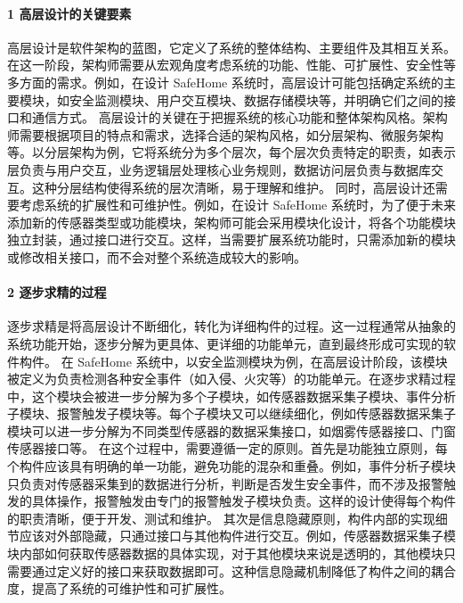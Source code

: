 \paragraph{1 高层设计的关键要素}\label{ux9ad8ux5c42ux8bbeux8ba1ux7684ux5173ux952eux8981ux7d20}
高层设计是软件架构的蓝图，它定义了系统的整体结构、主要组件及其相互关系。在这一阶段，架构师需要从宏观角度考虑系统的功能、性能、可扩展性、安全性等多方面的需求。例如，在设计 SafeHome
系统时，高层设计可能包括确定系统的主要模块，如安全监测模块、用户交互模块、数据存储模块等，并明确它们之间的接口和通信方式。
高层设计的关键在于把握系统的核心功能和整体架构风格。架构师需要根据项目的特点和需求，选择合适的架构风格，如分层架构、微服务架构等。以分层架构为例，它将系统分为多个层次，每个层次负责特定的职责，如表示层负责与用户交互，业务逻辑层处理核心业务规则，数据访问层负责与数据库交互。这种分层结构使得系统的层次清晰，易于理解和维护。
同时，高层设计还需要考虑系统的扩展性和可维护性。例如，在设计 SafeHome
系统时，为了便于未来添加新的传感器类型或功能模块，架构师可能会采用模块化设计，将各个功能模块独立封装，通过接口进行交互。这样，当需要扩展系统功能时，只需添加新的模块或修改相关接口，而不会对整个系统造成较大的影响。 \paragraph{2
逐步求精的过程}\label{ux9010ux6b65ux6c42ux7cbeux7684ux8fc7ux7a0b}
逐步求精是将高层设计不断细化，转化为详细构件的过程。这一过程通常从抽象的系统功能开始，逐步分解为更具体、更详细的功能单元，直到最终形成可实现的软件构件。 在 SafeHome
系统中，以安全监测模块为例，在高层设计阶段，该模块被定义为负责检测各种安全事件（如入侵、火灾等）的功能单元。在逐步求精过程中，这个模块会被进一步分解为多个子模块，如传感器数据采集子模块、事件分析子模块、报警触发子模块等。每个子模块又可以继续细化，例如传感器数据采集子模块可以进一步分解为不同类型传感器的数据采集接口，如烟雾传感器接口、门窗传感器接口等。
在这个过程中，需要遵循一定的原则。首先是功能独立原则，每个构件应该具有明确的单一功能，避免功能的混杂和重叠。例如，事件分析子模块只负责对传感器采集到的数据进行分析，判断是否发生安全事件，而不涉及报警触发的具体操作，报警触发由专门的报警触发子模块负责。这样的设计使得每个构件的职责清晰，便于开发、测试和维护。
其次是信息隐藏原则，构件内部的实现细节应该对外部隐藏，只通过接口与其他构件进行交互。例如，传感器数据采集子模块内部如何获取传感器数据的具体实现，对于其他模块来说是透明的，其他模块只需要通过定义好的接口来获取数据即可。这种信息隐藏机制降低了构件之间的耦合度，提高了系统的可维护性和可扩展性。
